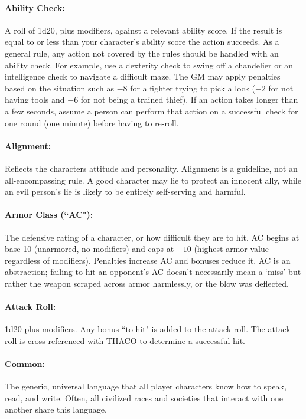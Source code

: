 \begin{multicols}{2}
\paragraph{Ability Check:} A roll of 1d20, plus modifiers, against a relevant ability score.  If the result is equal to or less than your character's ability score the action succeeds.  As a general rule, any action not covered by the rules should be handled with an ability check.  For example, use a dexterity check to swing off a chandelier or an intelligence check to navigate a difficult maze.  The GM may apply penalties based on the situation such as $-8$ for a fighter trying to pick a lock ($-2$ for not having tools and $-6$ for not being a trained thief).   If an action takes longer than a few seconds, assume a person can perform that action on a successful check for one round (one minute) before having to re-roll.

\paragraph{Alignment:} Reflects the characters attitude and personality.  Alignment is a guideline, not an all-encompassing rule.  A good character may lie to protect an innocent ally, while an evil person's lie is likely to be entirely self-serving and harmful.

\paragraph{Armor Class (``AC"):} The defensive rating of a character, or how difficult they are to hit.  AC begins at base 10 (unarmored, no modifiers) and caps at $-10$ (highest armor value regardless of modifiers).  Penalties increase AC and bonuses reduce it.  AC is an abstraction; failing to hit an opponent's AC doesn't necessarily mean a ‘miss' but rather the weapon scraped across armor harmlessly, or the blow was deflected.

\paragraph{Attack Roll:} 1d20 plus modifiers.  Any bonus ``to hit" is added to the attack roll.  The attack roll is cross-referenced with THACO to determine a successful hit.

\paragraph{Common:} The generic, universal language that all player characters know how to speak, read, and write.  Often, all civilized races and societies that interact with one another share this language.  


\end{multicols}

